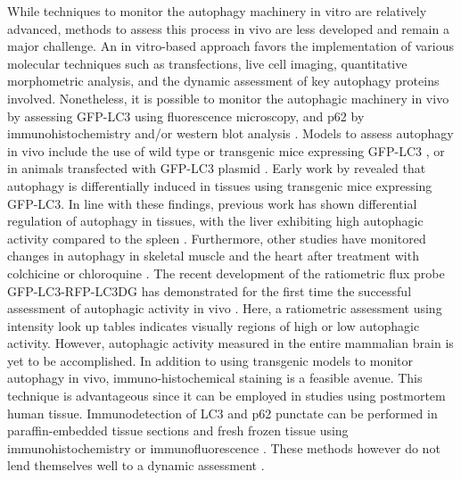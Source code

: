 While techniques to monitor the autophagy machinery in vitro are relatively advanced, methods to assess this process in vivo are less developed and remain a major challenge. An in vitro-based approach favors the implementation of various molecular techniques such as transfections, live cell imaging, quantitative morphometric analysis, and the dynamic assessment of key autophagy proteins involved. Nonetheless, it is possible to monitor the autophagic machinery in vivo by assessing GFP-LC3 using fluorescence microscopy, and p62 by immunohistochemistry and/or western blot analysis \citep{klionsky2016}. Models to assess autophagy in vivo include the use of wild type or transgenic mice expressing GFP-LC3 \citep{Mizushima2004a,Rodriguez-Muela2012}, or in animals transfected with GFP-LC3 plasmid \citep{Mammucari2007}. Early work by \citet{Mizushima2004a} revealed that autophagy is differentially induced in tissues using transgenic mice expressing GFP-LC3. In line with these findings, previous work has shown differential regulation of autophagy in tissues, with the liver exhibiting high autophagic activity compared to the spleen \citep{Haspel2011}. Furthermore, other studies have monitored changes in autophagy in skeletal muscle and the heart after treatment with colchicine \citep{Ju2010} or chloroquine \citep{Kanamori2015}. The recent development of the ratiometric flux probe GFP-LC3-RFP-LC3DG has demonstrated for the first time the successful assessment of autophagic activity in vivo \citep{Kaizuka2016}. Here, a ratiometric assessment using intensity look up tables indicates visually regions of high or low autophagic activity. However, autophagic activity measured in the entire mammalian brain is yet to be accomplished. In addition to using transgenic models to monitor autophagy in vivo, immuno-histochemical staining is a feasible avenue. This technique is advantageous since it can be employed in studies using postmortem human tissue. Immunodetection of LC3 and p62 punctate can be performed in paraffin-embedded tissue sections and fresh frozen tissue using immunohistochemistry or immunofluorescence \citep{He2016,Holt2011,Martinet2006,Schlafli2015}. These methods however do not lend themselves well to a dynamic assessment \citep{klionsky2016}.

